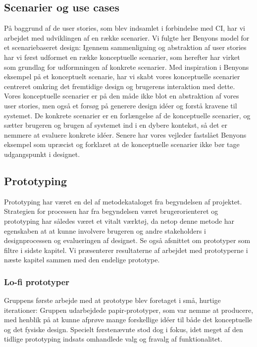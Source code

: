 \subsection{Scenarier og use cases}
På baggrund af de user stories, som blev indsamlet i forbindelse med CI, har vi arbejdet med udviklingen af en række scenarier. Vi fulgte her Benyons model for et scenariebaseret design: Igennem sammenligning og abstraktion af user stories har vi først udformet en række konceptuelle scenarier, som herefter har virket som grundlag for udformningen af konkrete scenarier.
Med inspiration i Benyons eksempel på et konceptuelt scenarie, har vi skabt vores konceptuelle scenarier centreret omkring det fremtidige design og brugerens interaktion med dette. Vores konceptuelle scenarier er på den måde ikke blot en abstraktion af vores user stories, men også et forsøg på generere design idéer og forstå kravene til systemet. De konkrete scenarier er en forlængelse af de konceptuelle scenarier, og sætter brugeren og brugen af systemet ind i en dybere kontekst, så det er nemmere at evaluere konkrete idéer. 
Senere har vores vejleder fastslået Benyons eksempel som upræcist og forklaret at de konceptuelle scenarier ikke bør tage udgangspunkt i designet. 

\subsection{Prototyping}
Prototyping har været en del af metodekataloget fra begyndelsen af projektet. Strategien for processen har fra begyndelsen været brugerorienteret og prototyping har således været et vitalt værktøj, da netop denne metode har egenskaben at at kunne involvere brugeren og andre stakeholders i designprocessen og evalueringen af designet. Se også afsnittet om prototyper som filtre i sidste kapitel. Vi præsenterer resultaterne af arbejdet med prototyperne i næste kapitel sammen med den endelige prototype.

\subsubsection{Lo-fi prototyper}
Gruppens første arbejde med at prototype blev foretaget i små, hurtige iterationer: Gruppen udarbejdede papir-prototyper, som var nemme at producere, med henblik på at kunne afprøve mange forskellige idéer til både det konceptuelle og det fysiske design. Specielt førstenævnte stod dog i fokus, idet meget af den tidlige prototyping indsats omhandlede valg og fravalg af funktionalitet.

